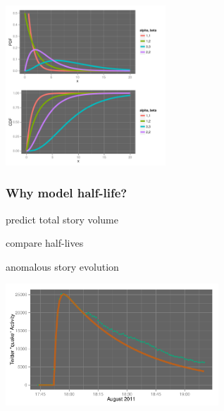\documentclass{beamer}
\begin{document}

\begin{frame}
  \begin{center}
   \includegraphics[height=6cm]{./imgs/SMP_gammadist.pdf}
  \end{center}
\end{frame}

\begin{frame}\frametitle{Why model half-life?}
\begin{center}
\begin{itemize}
\Huge{
\item predict total story volume
\item compare half-lives
\item anomalous story evolution
}
\end{itemize}
\end{center}
\end{frame}

\begin{frame}
  \begin{center}
    \includegraphics[width=8cm]{./imgs/SMP_va_quake_fit1.pdf}
  \end{center}
\end{frame}

\end{document}
